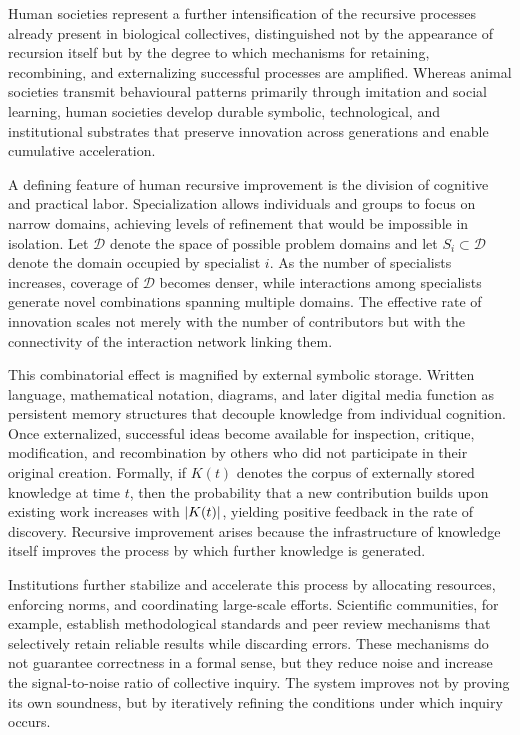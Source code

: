 \documentclass[11pt]{article}
\begin{document}
Human societies represent a further intensification of the recursive processes already present in biological collectives, distinguished not by the appearance of recursion itself but by the degree to which mechanisms for retaining, recombining, and externalizing successful processes are amplified. Whereas animal societies transmit behavioural patterns primarily through imitation and social learning, human societies develop durable symbolic, technological, and institutional substrates that preserve innovation across generations and enable cumulative acceleration.

A defining feature of human recursive improvement is the division of cognitive and practical labor. Specialization allows individuals and groups to focus on narrow domains, achieving levels of refinement that would be impossible in isolation. Let $\mathcal{D}$ denote the space of possible problem domains and let $S_i \subset \mathcal{D}$ denote the domain occupied by specialist $i$. As the number of specialists increases, coverage of $\mathcal{D}$ becomes denser, while interactions among specialists generate novel combinations spanning multiple domains. The effective rate of innovation scales not merely with the number of contributors but with the connectivity of the interaction network linking them.

This combinatorial effect is magnified by external symbolic storage. Written language, mathematical notation, diagrams, and later digital media function as persistent memory structures that decouple knowledge from individual cognition. Once externalized, successful ideas become available for inspection, critique, modification, and recombination by others who did not participate in their original creation. Formally, if $K(t)$ denotes the corpus of externally stored knowledge at time $t$, then the probability that a new contribution builds upon existing work increases with $\abs{K(t)}$, yielding positive feedback in the rate of discovery. Recursive improvement arises because the infrastructure of knowledge itself improves the process by which further knowledge is generated.

Institutions further stabilize and accelerate this process by allocating resources, enforcing norms, and coordinating large-scale efforts. Scientific communities, for example, establish methodological standards and peer review mechanisms that selectively retain reliable results while discarding errors. These mechanisms do not guarantee correctness in a formal sense, but they reduce noise and increase the signal-to-noise ratio of collective inquiry. The system improves not by proving its own soundness, but by iteratively refining the conditions under which inquiry occurs.
\end{document}
